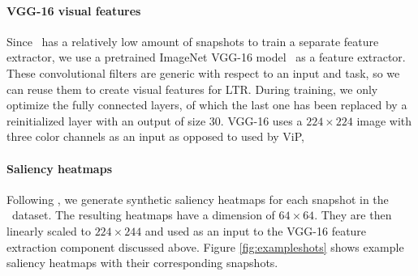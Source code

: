 \paragraph{VGG-16 visual features}
Since \datasetname~has a relatively low amount of snapshots to train a separate feature extractor, we use a pretrained ImageNet VGG-16 model~\cite{simonyan2014very} as a feature extractor.
These convolutional filters  are generic with respect to an input and task, so we can reuse them to create visual features for LTR.
During training, we only optimize the fully connected layers, of which the last one has been replaced by a reinitialized layer with an output of size $30$.
VGG-16 uses a $224\times224$ image with three color channels as an input
as opposed to  used by ViP,

\paragraph{Saliency heatmaps}
Following \cite{shan2017two}, we generate synthetic saliency heatmaps for each snapshot in the \datasetname~data\-set.
The resulting heatmaps have a dimension of $64\times64$.
They are then linearly scaled to $224\times244$ and used as an input to the VGG-16 feature extraction component discussed above.
Figure \ref{fig:exampleshots} shows example saliency heatmaps with their corresponding snapshots.
